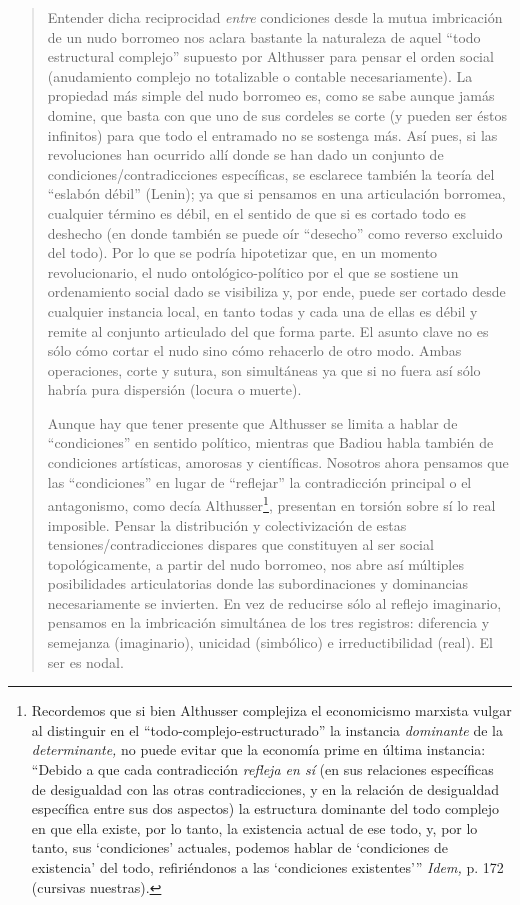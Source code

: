 \begin{quote}
Entender dicha reciprocidad \emph{entre} condiciones desde la mutua imbricación de un nudo borromeo nos aclara bastante la naturaleza de aquel \enquote{todo estructural complejo} supuesto por Althusser para pensar el orden social (anudamiento complejo no totalizable o contable necesariamente). La propiedad más simple del nudo borromeo es, como se sabe aunque jamás domine, que basta con que uno de sus cordeles se corte (y pueden ser éstos infinitos) para que todo el entramado no se sostenga más. Así pues, si las revoluciones han ocurrido allí donde se han dado un conjunto de condiciones/contradicciones específicas, se esclarece también la teoría del \enquote{eslabón débil} (Lenin); ya que si pensamos en una articulación borromea, cualquier término es débil, en el sentido de que si es cortado todo es deshecho (en donde también se puede oír \enquote{desecho} como reverso excluido del todo). Por lo que se podría hipotetizar que, en un momento revolucionario, el nudo ontológico-político por el que se sostiene un ordenamiento social dado se visibiliza y, por ende, puede ser cortado desde cualquier instancia local, en tanto todas y cada una de ellas es débil y remite al conjunto articulado del que forma parte. El asunto clave no es sólo cómo cortar el nudo sino cómo rehacerlo de otro modo. Ambas operaciones, corte y sutura, son simultáneas ya que si no fuera así sólo habría pura dispersión (locura o muerte).

Aunque hay que tener presente que Althusser se limita a hablar de \enquote{condiciones} en sentido político, mientras que Badiou habla también de condiciones artísticas, amorosas y científicas. Nosotros ahora pensamos que las \enquote{condiciones} en lugar de \enquote{reflejar} la contradicción principal o el antagonismo, como decía Althusser\footnote{Recordemos que si bien Althusser complejiza el economicismo marxista vulgar al distinguir en el \enquote{todo-complejo-estructurado} la instancia \emph{dominante} de la \emph{determinante,} no puede evitar que la economía prime en última instancia: \enquote{Debido a que cada contradicción \emph{refleja en sí} (en sus relaciones específicas de desigualdad con las otras contradicciones, y en la relación de desigualdad específica entre sus dos aspectos) la estructura dominante del todo complejo en que ella existe, por lo tanto, la existencia actual de ese todo, y, por lo tanto, sus \enquote{condiciones} actuales, podemos hablar de \enquote{condiciones de existencia} del todo, refiriéndonos a las \enquote{condiciones existentes}} \emph{Idem,} p. 172 (cursivas nuestras).}, presentan en torsión sobre sí  lo real imposible. Pensar la distribución y colectivización de estas tensiones/contradicciones dispares que constituyen al ser social topológicamente, a partir del nudo borromeo, nos abre así múltiples posibilidades articulatorias donde las subordinaciones y dominancias necesariamente se invierten. En vez de reducirse sólo al reflejo imaginario, pensamos en la imbricación simultánea de los tres registros: diferencia y semejanza (imaginario), unicidad (simbólico) e irreductibilidad (real). El ser es nodal.


\end{quote}
